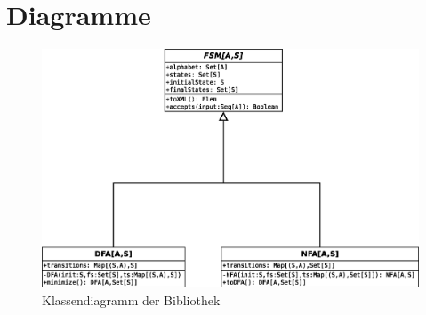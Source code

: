 \section{Diagramme}

\begin{figure}[h!]
	\centering
	\includegraphics[width=\textwidth]{images/scalomator.eps}
	\caption{Klassendiagramm der Bibliothek}
	\label{class_diagram}
\end{figure}
